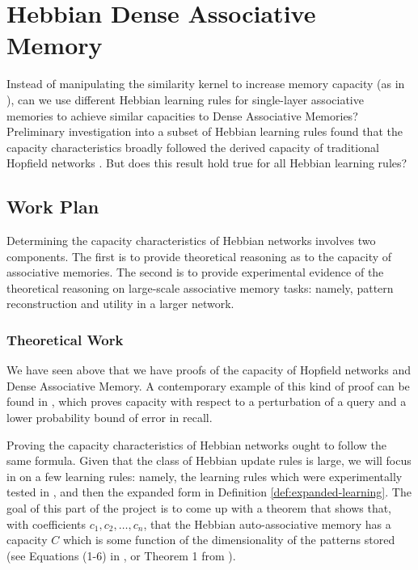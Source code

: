 \documentclass{article}
\theoremstyle{definition}
\begin{document}
\section{Hebbian Dense Associative Memory}\label{sec:hebbian-dam}

Instead of manipulating the similarity kernel to increase
memory capacity (as in \textcite{hoover_dense_2024,hu_provably_2024}),
can we use different Hebbian learning rules for
single-layer associative memories to
achieve similar capacities to Dense Associative Memories? Preliminary
investigation into a subset of Hebbian learning rules
found that the capacity characteristics broadly followed the
derived capacity of traditional Hopfield networks
\parencite{lansner_benchmarking_2025}. But does this result
hold true for all Hebbian learning rules?

\subsection{Work Plan}\label{sec:work-plan}

Determining the capacity characteristics of Hebbian networks
involves two components. The first is to provide theoretical reasoning
as to the capacity of associative memories. The second is to
provide experimental evidence of the theoretical reasoning on
large-scale associative memory tasks: namely, pattern reconstruction
and utility in a larger network.

\subsubsection{Theoretical Work}

We have seen above that we have proofs of the capacity of
Hopfield networks and Dense Associative Memory. A contemporary
example of this kind of proof can be found in \parencite{bao_capacity_2022},
which proves capacity with respect to a perturbation of a query
and a lower probability bound of error in recall.

Proving the capacity characteristics of Hebbian networks ought to
follow the same formula. Given that the class of Hebbian update rules
is large, we will focus in on a few learning rules: namely,
the learning rules which were experimentally tested in
\textcite{lansner_benchmarking_2025}, and then the expanded
form in Definition \ref{def:expanded-learning}. The goal of this
part of the project is to come up with a theorem that shows that,
with coefficients $c_1, c_2, \dots, c_n$, that the Hebbian
auto-associative memory has a capacity $C$ which is some
function of the dimensionality of the patterns stored
(see Equations (1-6) in \textcite{lansner_benchmarking_2025}, or
Theorem 1 from \textcite{bao_capacity_2022}).
\end{document}

